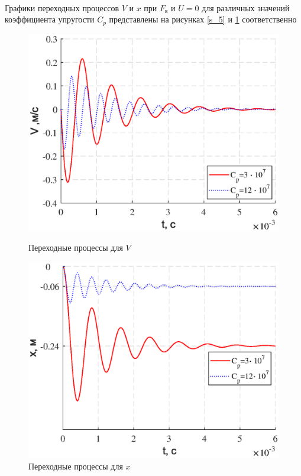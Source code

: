 \documentclass[a4paper,12pt]{article}
\begin{document}
			\paragraph {} Графики переходных процессов $V$ и $x$ при $F_{\text{в}}$ и $U=0$ для различных значений коэффициента упругости $C_p$ представлены на рисунках \ref{s_5} и \ref{s_6} соответственно\\
			
			\begin{figure}[h!]
				\begin{center}
					\begin{minipage}[h]{0.45\linewidth}
						\renewcommand{\figurename}{Рисунок}
						\includegraphics[width=1\linewidth]{v_pri_cp.eps}
						\caption{Переходные процессы для $V$} 
						\label{s_5} 
					\end{minipage}
					\hfill 
					\begin{minipage}[h]{0.45\linewidth}
						\renewcommand{\figurename}{Рисунок}
						\includegraphics[width=1\linewidth]{x_pri_cp.eps}
						\caption{Переходные процессы для $x$}
						\label{s_6}
					\end{minipage}
				\end{center}
			\end{figure}	
\end{document}
